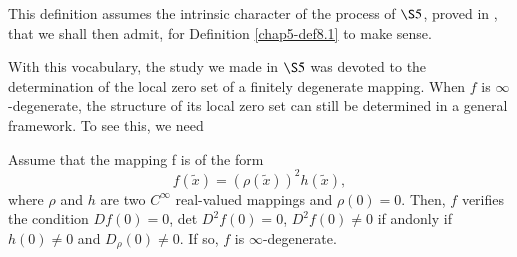 \begin{remark}\label{chap5-rem8.1}
This definition assumes the intrinsic character of the process of $\S
5$, proved in \cite{32}, that we shall then admit, for Definition
\ref{chap5-def8.1} to make sense.
\end{remark}

With this vocabulary, the study we made in $\S 5$ was devoted to the
determination of the local zero set of a finitely degenerate
mapping. When $f$ is $\infty$-degenerate, the structure of its local
zero set can still be determined in a general framework. To see this,
we need
\begin{proposition}\label{chap5-prop8.1}
Assume that the mapping f is of the form
\begin{equation*}
f(\widetilde{x}) = (\rho(\widetilde{x}))^{2} h(\widetilde{x}),\tag{8.1}\label{chap5-eq8.1}
\end{equation*}
where $\rho$ and $h$ are two $C^{\infty}$ real-valued mappings and
$\rho(0) = 0$. Then, $f$ verifies the condition $Df(0) = 0$, det
$D^{2}f(0) = 0$, $D^{2}f(0) \neq 0$ if and\pageoriginale only if $h(0)
\neq 0$ and $D_{\rho}(0) \neq 0$. If so, $f$ is $\infty$-degenerate.
\end{proposition}

